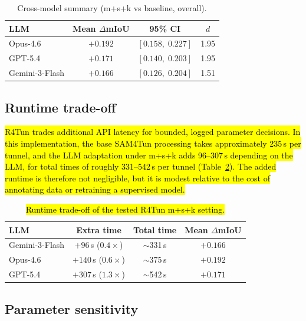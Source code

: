\documentclass[a4paper,fleqn]{cas-dc}
\begin{document}
{\begin{table}[ht]
\caption{Cross-model summary (m+s+k vs baseline, overall).}\label{tab:cross-model}
\begin{tabular*}{\tblwidth}{@{} l c c c @{}}
\toprule
LLM & Mean $\Delta$mIoU & 95\% CI & \mbox{$d$} \\
\midrule
Opus-4.6 & $+0.192$ & $[0.158,\; 0.227]$ & 1.95 \\
GPT-5.4 & $+0.171$ & $[0.140,\; 0.203]$ & 1.95 \\
Gemini-3-Flash & $+0.166$ & $[0.126,\; 0.204]$ & 1.51 \\
\bottomrule
\end{tabular*}
\end{table}

\subsection{Runtime trade-off}\label{sec:runtime-tradeoff}

\hl{R4Tun trades additional API latency for bounded, logged parameter decisions. In this implementation, the base SAM4Tun processing takes approximately 235\,s per tunnel, and the LLM adaptation under m+s+k adds 96--307\,s depending on the LLM, for total times of roughly 331--542\,s per tunnel (Table~\ref{tab:runtime-tradeoff}). The added runtime is therefore not negligible, but it is modest relative to the cost of annotating data or retraining a supervised model.}

\begin{table}[ht]
\caption{\hl{Runtime trade-off of the tested R4Tun m+s+k setting.}}\label{tab:runtime-tradeoff}
\begin{tabular*}{\tblwidth}{@{} l c c c @{}}
\toprule
LLM & Extra time & Total time & Mean $\Delta$mIoU \\
\midrule
Gemini-3-Flash & $+96$\,s ($0.4\times$) & $\sim$331\,s & $+0.166$ \\
Opus-4.6 & $+140$\,s ($0.6\times$) & $\sim$375\,s & $+0.192$ \\
GPT-5.4 & $+307$\,s ($1.3\times$) & $\sim$542\,s & $+0.171$ \\
\bottomrule
\end{tabular*}
\end{table}

\subsection{Parameter sensitivity}\label{sec:sensitivity}

}
\end{document}
